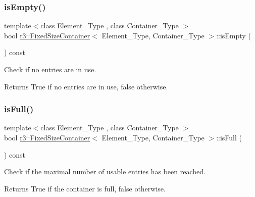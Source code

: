 \subsubsection{\texorpdfstring{is\+Empty()}{isEmpty()}}
{\footnotesize\ttfamily template$<$class Element\+\_\+\+Type , class Container\+\_\+\+Type $>$ \\
bool \mbox{\hyperlink{classr3_1_1_fixed_size_container}{r3\+::\+Fixed\+Size\+Container}}$<$ Element\+\_\+\+Type, Container\+\_\+\+Type $>$\+::is\+Empty (\begin{DoxyParamCaption}{ }\end{DoxyParamCaption}) const}



Check if no entries are in use. 

\begin{DoxyReturn}{Returns}
True if no entries are in use, false otherwise. 
\end{DoxyReturn}
\mbox{\label{classr3_1_1_fixed_size_container_ae3beb2a45a67d3bd4f6cb32f39805889}} 
\subsubsection{\texorpdfstring{is\+Full()}{isFull()}}
{\footnotesize\ttfamily template$<$class Element\+\_\+\+Type , class Container\+\_\+\+Type $>$ \\
bool \mbox{\hyperlink{classr3_1_1_fixed_size_container}{r3\+::\+Fixed\+Size\+Container}}$<$ Element\+\_\+\+Type, Container\+\_\+\+Type $>$\+::is\+Full (\begin{DoxyParamCaption}{ }\end{DoxyParamCaption}) const}



Check if the maximal number of usable entries has been reached. 

\begin{DoxyReturn}{Returns}
True if the container is full, false otherwise. 
\end{DoxyReturn}
\mbox{\label{classr3_1_1_fixed_size_container_a56aa3725cacf135fc1eacddbf424c868}} 
